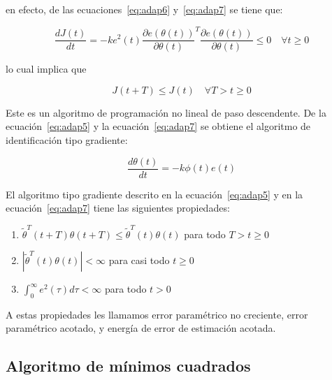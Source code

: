             en efecto, de las ecuaciones~\ref{eq:adap6} y~\ref{eq:adap7} se tiene que:

            \begin{equation*}
                \frac{d J(t)}{dt} = -k e^2(t) \frac{\partial e(\theta(t))}{\partial \theta(t)}^T \frac{\partial e(\theta(t))}{\partial \theta(t)} \le 0 \quad \forall t \ge 0
            \end{equation*}

            lo cual implica que

            \begin{equation}
                J(t + T) \le J(t) \quad \forall T > t \ge 0
            \end{equation}

            Este es un algoritmo de programación no lineal de paso descendente.
            De la ecuación~\ref{eq:adap5} y la ecuación~\ref{eq:adap7} se obtiene el algoritmo de identificación tipo gradiente:

            \begin{equation} \label{eq:adap7}
                \frac{d \theta(t)}{dt} = -k \phi(t)e(t)
            \end{equation}


            \begin{lema}
                El algoritmo tipo gradiente descrito en la ecuación~\ref{eq:adap5} y en la ecuación~\ref{eq:adap7} tiene las siguientes propiedades:

                \begin{enumerate}
                    \item $\tilde{\theta}^T(t + T) \theta(t + T) \le \tilde{\theta}^T(t) \theta(t)$ para todo $T > t \ge 0$
                    \item $\left| \tilde{\theta}^T(t) \theta(t) \right| < \infty$ para casi todo $t \ge 0$
                    \item $\int_0^{\infty} e^2(\tau) d\tau < \infty$ para todo $t > 0$
                \end{enumerate}

                A estas propiedades les llamamos error paramétrico no creciente, error paramétrico acotado, y energía de error de estimación acotada.
            \end{lema}


        \subsection{Algoritmo de mínimos cuadrados}
